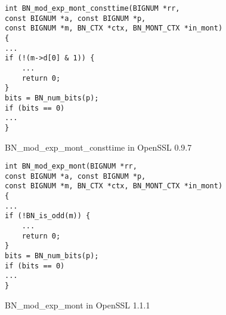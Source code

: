 \begin{figure}[h]
\centering
\begin{lstlisting}[xleftmargin=.02\textwidth,xrightmargin=.01\textwidth]
int BN_mod_exp_mont_consttime(BIGNUM *rr, 
const BIGNUM *a, const BIGNUM *p,
const BIGNUM *m, BN_CTX *ctx, BN_MONT_CTX *in_mont)
{
... 
if (!(m->d[0] & 1)) {
    ... 
    return 0;
}
bits = BN_num_bits(p);
if (bits == 0) 
...
}
\end{lstlisting}
    \vspace*{-6pt}
    \caption{\textsf{BN\_mod\_exp\_mont\_consttime} in OpenSSL 0.9.7}
    \label{appen:fig:exp}
    \vspace*{-6pt}
\end{figure}



\begin{figure}[h]
    \centering
    \begin{lstlisting}[xleftmargin=.02\textwidth,xrightmargin=.01\textwidth]
int BN_mod_exp_mont(BIGNUM *rr, 
const BIGNUM *a, const BIGNUM *p,
const BIGNUM *m, BN_CTX *ctx, BN_MONT_CTX *in_mont)
{
...
if (!BN_is_odd(m)) {
    ...
    return 0;
}
bits = BN_num_bits(p);
if (bits == 0) 
...
}

\end{lstlisting}
    \vspace*{-6pt}
    \caption{\textsf{BN\_mod\_exp\_mont} in OpenSSL 1.1.1}
    \label{appen:fig:exp_new}
    \vspace*{-6pt}
\end{figure}

